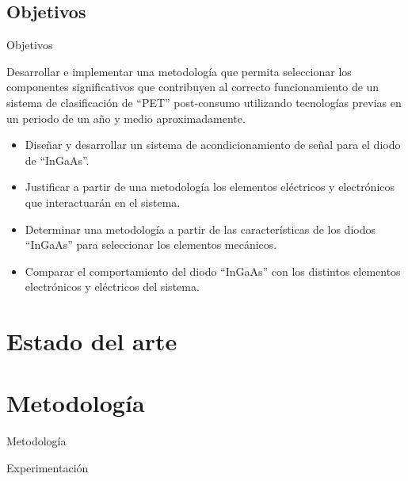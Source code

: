 \documentclass[10pt]{beamer}
\begin{document}
\subsection{Objetivos}
\begin{frame}{Objetivos}

Desarrollar e implementar una metodología que permita seleccionar los componentes significativos que contribuyen al correcto funcionamiento de un sistema de clasificación de “PET” post-consumo utilizando tecnologías previas en un periodo de un año y medio aproximadamente.

\begin{itemize}
    \item Diseñar y desarrollar un sistema de acondicionamiento de señal para el diodo de ``InGaAs''.
    \item Justificar a partir de una metodología los elementos eléctricos y electrónicos que interactuarán en el sistema.
    \item Determinar una metodología a partir de las características de los diodos ``InGaAs'' para seleccionar los elementos mecánicos.
    \item Comparar el comportamiento del diodo ``InGaAs'' con los distintos elementos electrónicos y eléctricos del sistema.
\end{itemize}
\end{frame}





\section{Estado del arte}


\section{Metodología}

\begin{frame}{Metodología}

\end{frame}


\begin{frame}{Experimentación}

\end{frame}
\end{document}
